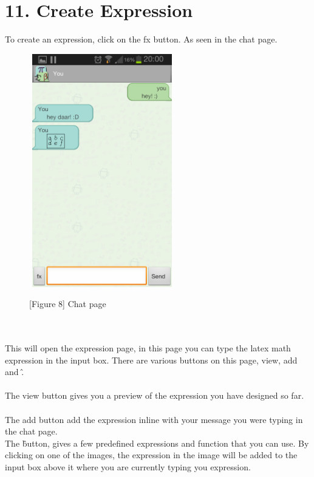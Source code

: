\documentclass[29pt,a4paper]{moderncv}
\begin{document}
				\section*{11. Create Expression}
				\vspace{5mm}
				To create an expression, click on the fx button. As seen in the chat page.\\
				\noindent\begin{figure}
				\centering
				\includegraphics[width=2.5in, height=4.0in]{./Screenshot_2013-10-23-20-00-45.png} \\
				\centering \caption{[Figure 8] Chat page}
				\end{figure}\\
				
				\\This will open the expression page, in this page you can type the latex math expression in the input box.
				There are various buttons on this page, view, add and \^. \\
				\\The view button gives you a preview of the expression you have designed so far.\\
\\				The add button add the expression  inline with your message you were typing in the chat page.\\
				The \^ button, gives a few predefined expressions and function that you can use. By clicking on one of the images, the expression in the image will be added to the input box above it where you are currently typing you expression.\\
				
\end{document}
